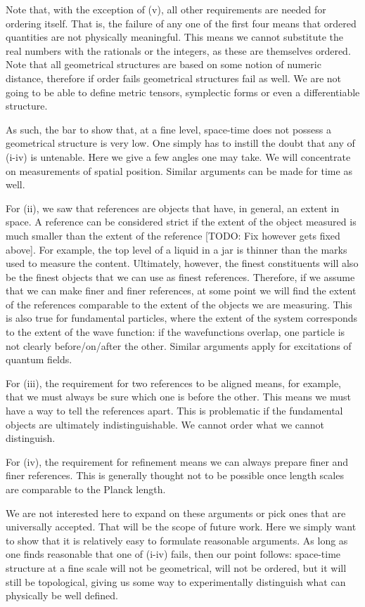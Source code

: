\documentclass[12pt]{iopart}
\begin{document}
Note that, with the exception of (v), all other requirements are needed for ordering itself. That is, the failure of any one of the first four means that ordered quantities are not physically meaningful. This means we cannot substitute the real numbers with the rationals or the integers, as these are themselves ordered. Note that all geometrical structures are based on some notion of numeric distance, therefore if order fails geometrical structures fail as well. We are not going to be able to define metric tensors, symplectic forms or even a differentiable structure.

As such, the bar to show that, at a fine level, space-time does not possess a geometrical structure is very low. One simply has to instill the doubt that any of (i-iv) is untenable. Here we give a few angles one may take. We will concentrate on measurements of spatial position. Similar arguments can be made for time as well.

For (ii), we saw that references are objects that have, in general, an extent in space. A reference can be considered strict if the extent of the object measured is much smaller than the extent of the reference [TODO: Fix however gets fixed above]. For example, the top level of a liquid in a jar is thinner than the marks used to measure the content. Ultimately, however, the finest constituents will also be the finest objects that we can use as finest references. Therefore, if we assume that we can make finer and finer references, at some point we will find the extent of the references comparable to the extent of the objects we are measuring. This is also true for fundamental particles, where the extent of the system corresponds to the extent of the wave function: if the wavefunctions overlap, one particle is not clearly before/on/after the other. Similar arguments apply for excitations of quantum fields.

For (iii), the requirement for two references to be aligned means, for example, that we must always be sure which one is before the other. This means we must have a way to tell the references apart. This is problematic if the fundamental objects are ultimately indistinguishable. We cannot order what we cannot distinguish.

For (iv), the requirement for refinement means we can always prepare finer and finer references. This is generally thought not to be possible once length scales are comparable to the Planck length.

We are not interested here to expand on these arguments or pick ones that are universally accepted. That will be the scope of future work. Here we simply want to show that it is relatively easy to formulate reasonable arguments. As long as one finds reasonable that one of (i-iv) fails, then our point follows: space-time structure at a fine scale will not be geometrical, will not be ordered, but it will still be topological, giving us some way to experimentally distinguish what can physically be well defined.
\end{document}
